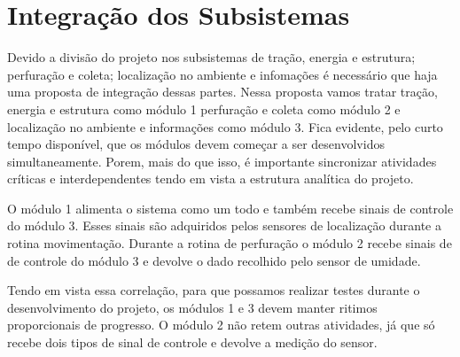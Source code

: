 \chapter{Integração dos Subsistemas}
Devido a divisão do projeto nos subsistemas de tração, energia e estrutura;
 perfuração e coleta; localização no ambiente e infomações é necessário que haja uma proposta de
 integração dessas partes. Nessa proposta vamos tratar tração, energia e estrutura como módulo 1
 perfuração e coleta como módulo 2 e localização no ambiente e informações como módulo 3.
 Fica evidente, pelo curto tempo disponível, que os módulos devem começar a ser desenvolvidos simultaneamente.
 Porem, mais do que isso, é importante sincronizar atividades críticas e interdependentes tendo em vista a estrutura analítica
 do projeto.

 O módulo 1 alimenta o sistema como um todo e também recebe sinais de controle do módulo 3. Esses sinais são adquiridos
 pelos sensores de localização durante a rotina movimentação. Durante a rotina de perfuração o módulo 2 recebe sinais de
 de controle do módulo 3 e devolve o dado recolhido pelo sensor de umidade.

 Tendo em vista essa correlação, para que possamos realizar testes durante o desenvolvimento do projeto, os módulos 1 e 3
 devem manter ritimos proporcionais de progresso. O módulo 2 não retem outras atividades, já que só recebe dois tipos
 de sinal de controle e devolve a medição do sensor.
